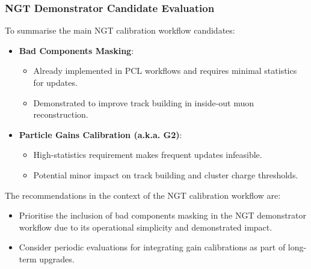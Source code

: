 \subsubsection{NGT Demonstrator Candidate Evaluation}

To summarise the main NGT calibration workflow candidates:
\begin{itemize}
    \item \textbf{Bad Components Masking}:
    \begin{itemize}
        \item Already implemented in PCL workflows and requires minimal statistics for updates.
        \item Demonstrated to improve track building in inside-out muon reconstruction.
    \end{itemize}
    \item \textbf{Particle Gains Calibration (a.k.a. G2)}:
    \begin{itemize}
        \item High-statistics requirement makes frequent updates infeasible.
        \item Potential minor impact on track building and cluster charge thresholds.
    \end{itemize}
\end{itemize}

The recommendations in the context of the NGT calibration workflow are:
\begin{itemize}
    \item Prioritise the inclusion of bad components masking in the NGT demonstrator workflow due to its operational simplicity and demonstrated impact.
    \item Consider periodic evaluations for integrating gain calibrations as part of long-term upgrades.
\end{itemize}